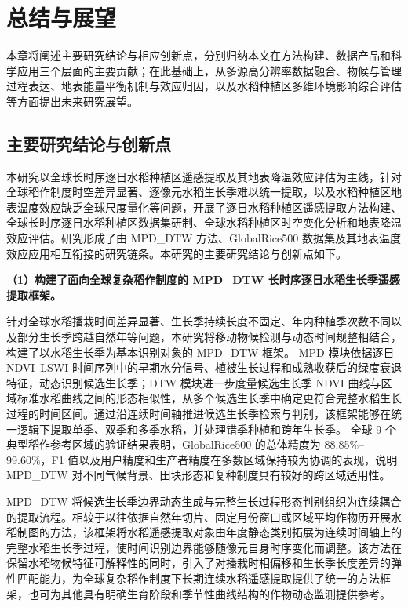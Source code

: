 \chapter{总结与展望}

本章将阐述主要研究结论与相应创新点，分别归纳本文在方法构建、数据产品和科学应用三个层面的主要贡献；在此基础上，从多源高分辨率数据融合、物候与管理过程表达、地表能量平衡机制与效应归因，以及水稻种植区多维环境影响综合评估等方面提出未来研究展望。

\section{主要研究结论与创新点}
本研究以全球长时序逐日水稻种植区遥感提取及其地表降温效应评估为主线，针对全球稻作制度时空差异显著、逐像元水稻生长季难以统一提取，以及水稻种植区地表温度效应缺乏全球尺度量化等问题，开展了逐日水稻种植区遥感提取方法构建、全球长时序逐日水稻种植区数据集研制、全球水稻种植区时空变化分析和地表降温效应评估。研究形成了由 MPD\_DTW 方法、GlobalRice500 数据集及其地表温度效应应用相互衔接的研究链条。本研究的主要研究结论与创新点如下。

\noindent\textbf{（1）构建了面向全球复杂稻作制度的 MPD\_DTW 长时序逐日水稻生长季遥感提取框架。}

针对全球水稻播栽时间差异显著、生长季持续长度不固定、年内种植季次数不同以及部分生长季跨越自然年等问题，本研究将移动物候检测与动态时间规整相结合，构建了以水稻生长季为基本识别对象的 MPD\_DTW 框架。
MPD 模块依据逐日 NDVI--LSWI 时间序列中的早期水分信号、植被生长过程和成熟收获后的绿度衰退特征，动态识别候选生长季；DTW 模块进一步度量候选生长季 NDVI 曲线与区域标准水稻曲线之间的形态相似性，从多个候选生长季中确定更符合完整水稻生长过程的时间区间。通过沿连续时间轴推进候选生长季检索与判别，该框架能够在统一逻辑下提取单季、双季和多季水稻，并处理错季种植和跨年生长季。
全球 9 个典型稻作参考区域的验证结果表明，GlobalRice500 的总体精度为 88.85\%--99.60\%，F1 值以及用户精度和生产者精度在多数区域保持较为协调的表现，说明 MPD\_DTW 对不同气候背景、田块形态和复种制度具有较好的跨区域适用性。

MPD\_DTW 将候选生长季边界动态生成与完整生长过程形态判别组织为连续耦合的提取流程。相较于以往依据自然年切片、固定月份窗口或区域平均作物历开展水稻制图的方法，该框架将水稻遥感提取对象由年度静态类别拓展为连续时间轴上的完整水稻生长季过程，使时间识别边界能够随像元自身时序变化而调整。该方法在保留水稻物候特征可解释性的同时，引入了对播栽时相偏移和生长季长度差异的弹性匹配能力，为全球复杂稻作制度下长期连续水稻遥感提取提供了统一的方法框架，也可为其他具有明确生育阶段和季节性曲线结构的作物动态监测提供参考。

